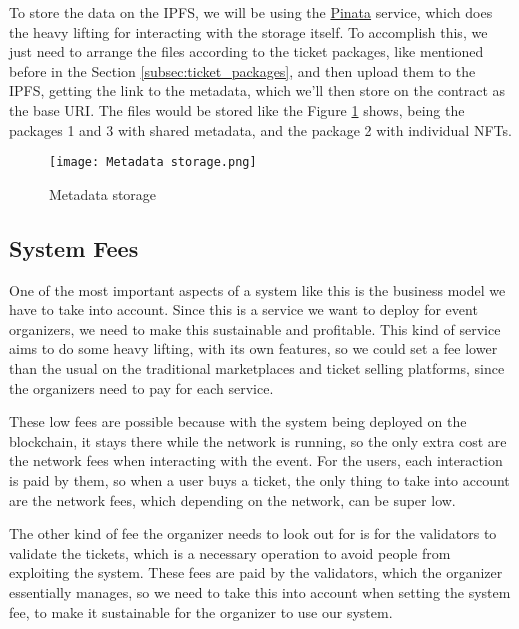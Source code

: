 To store the data on the IPFS, we will be using the \href{https://www.pinata.cloud/}{Pinata} service, which does the heavy lifting for interacting with the storage itself. To accomplish this, we just need to arrange the files according to the ticket packages, like mentioned before in the Section \ref{subsec:ticket_packages}, and then upload them to the IPFS, getting the link to the metadata, which we'll then store on the contract as the base URI. The files would be stored like the Figure \ref{fig:metadata_storage} shows, being the packages 1 and 3 with shared metadata, and the package 2 with individual NFTs.

\begin{figure}[H]
    \texttt{[image: Metadata storage.png]}
    \centering
    \caption{Metadata storage}
    \label{fig:metadata_storage}
\end{figure}

\subsection{System Fees}
\label{subsec:system_fees}

One of the most important aspects of a system like this is the business model we have to take into account. Since this is a service we want to deploy for event organizers, we need to make this sustainable and profitable. This kind of service aims to do some heavy lifting, with its own features, so we could set a fee lower than the usual on the traditional marketplaces and ticket selling platforms, since the organizers need to pay for each service.

These low fees are possible because with the system being deployed on the blockchain, it stays there while the network is running, so the only extra cost are the network fees when interacting with the event. For the users, each interaction is paid by them, so when a user buys a ticket, the only thing to take into account are the network fees, which depending on the network, can be super low.

The other kind of fee the organizer needs to look out for is for the validators to validate the tickets, which is a necessary operation to avoid people from exploiting the system. These fees are paid by the validators, which the organizer essentially manages, so we need to take this into account when setting the system fee, to make it sustainable for the organizer to use our system.

